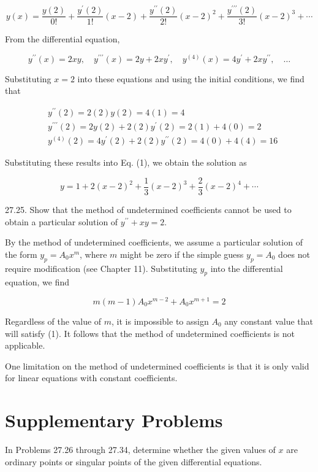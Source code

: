\documentclass[10pt]{article}
\begin{document}
\begin{equation*}
y(x)=\frac{y(2)}{0 !}+\frac{y^{\prime}(2)}{1 !}(x-2)+\frac{y^{\prime \prime}(2)}{2 !}(x-2)^{2}+\frac{y^{\prime \prime \prime}(2)}{3 !}(x-2)^{3}+\cdots \tag{1}
\end{equation*}


From the differential equation,

$$
y^{\prime \prime}(x)=2 x y, \quad y^{\prime \prime \prime}(x)=2 y+2 x y^{\prime}, \quad y^{(4)}(x)=4 y^{\prime}+2 x y^{\prime \prime}, \quad \ldots
$$

Substituting $x=2$ into these equations and using the initial conditions, we find that

$$
\begin{aligned}
& y^{\prime \prime}(2)=2(2) y(2)=4(1)=4 \\
& y^{\prime \prime \prime}(2)=2 y(2)+2(2) y^{\prime}(2)=2(1)+4(0)=2 \\
& y^{(4)}(2)=4 y^{\prime}(2)+2(2) y^{\prime \prime}(2)=4(0)+4(4)=16
\end{aligned}
$$

Substituting these results into Eq. (1), we obtain the solution as

$$
y=1+2(x-2)^{2}+\frac{1}{3}(x-2)^{3}+\frac{2}{3}(x-2)^{4}+\cdots
$$

27.25. Show that the method of undetermined coefficients cannot be used to obtain a particular solution of $y^{\prime \prime}+x y=2$.

By the method of undetermined coefficients, we assume a particular solution of the form $y_{p}=A_{0} x^{m}$, where $m$ might be zero if the simple guess $y_{p}=A_{0}$ does not require modification (see Chapter 11). Substituting $y_{p}$ into the differential equation, we find


\begin{equation*}
m(m-1) A_{0} x^{m-2}+A_{0} x^{m+1}=2 \tag{1}
\end{equation*}


Regardless of the value of $m$, it is impossible to assign $A_{0}$ any constant value that will satisfy (1). It follows that the method of undetermined coefficients is not applicable.

One limitation on the method of undetermined coefficients is that it is only valid for linear equations with constant coefficients.

\section*{Supplementary Problems}
In Problems 27.26 through 27.34, determine whether the given values of $x$ are ordinary points or singular points of the given differential equations.
\end{document}
